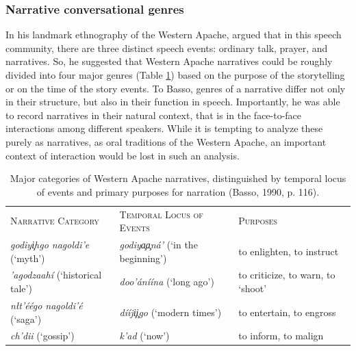 \documentclass[12pt, draft]{article}
\begin{document}
\subsubsection{Narrative conversational genres}
In his landmark ethnography of the Western Apache, \textcite{basso1990} argued that in this speech community, there are three distinct speech events: ordinary talk, prayer, and narratives. So, he suggested that Western Apache narratives could be roughly divided into four major genres (Table \ref{basso}) based on the purpose of the storytelling or on the time of the story events. To Basso, genres of a narrative differ not only in their structure, but also in their function in speech. Importantly, he was able to record narratives in their natural context, that is in the face-to-face interactions among different speakers. While it is tempting to analyze these purely as narratives, as oral traditions of the Western Apache, an important context of interaction would be lost in such an analysis.
\begin{table}[h]
\centering
\caption{Major categories of Western Apache narratives, distinguished by temporal locus of events and primary purposes for narration (Basso, 1990, p. 116).}
\label{basso}
\begin{tabular}{|p{2in} p{2.4in} p{1.6in}|} 
\hline
\textsc{Narrative Category} & \textsc{Temporal Locus of Events} & \textsc{Purposes}\\
\textit{godiy{\c i}hgo nagoldi'e} (`myth') & \textit{godiy{\c a\c a}n\'a'} (`in the beginning') & to enlighten, to instruct\\
\hline
\textit{'agodzaah\'i} (`historical tale') & \textit{doo'\'an\'i\'ina} (`long ago') & to criticize, to warn, to `shoot'\\ \hline
\textit{n\l t'\'e\'ego nagoldi'\'e} (`saga') & \textit{d\'i\'ij\c i\c igo} (`modern times') & to entertain, to engross\\ \hline
\textit{ch'dii} (`gossip') & \textit{k'ad} (`now') & to inform, to malign\\
\hline
\end{tabular}
\end{table}
\end{document}
